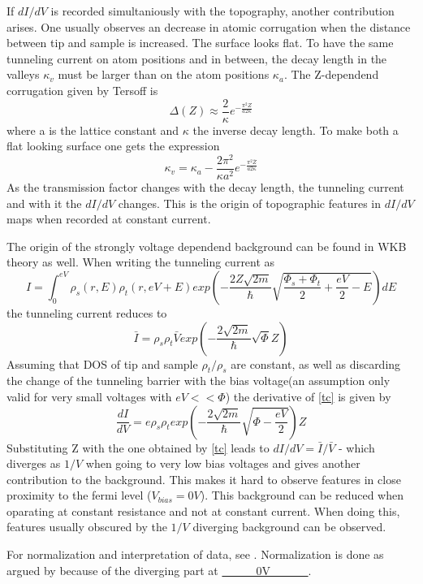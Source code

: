 If $dI/dV$ is recorded simultaniously with the topography, another contribution arises. One usually observes an decrease in atomic corrugation when the distance between tip and sample is increased. The surface looks flat. To have the same tunneling current on atom positions and in between, the decay length in the valleys $\kappa_v$ must be larger than on the atom positions $\kappa_a$. The Z-dependend corrugation given by Tersoff is $$\Delta(Z)\approx \frac{2}{\kappa}e^{-\frac{\pi^2Z}{a2\kappa}}$$ where a is the lattice constant and $\kappa$ the inverse decay length. To make both a flat looking surface one gets the expression
$$\kappa_v=\kappa_a-\frac{2\pi^2}{\kappa a^2}e^{-\frac{\pi^2\bar Z}{a2\kappa}}$$ 
As the transmission factor changes with the decay length, the tunneling current and with it the $dI/dV$ changes. This is the origin of topographic features in $dI/dV$ maps when recorded at constant current.

The origin of the strongly voltage dependend background can be found in WKB theory as well.
When writing the tunneling current as 
$$ I=\int_0^{eV}\rho_s(r,E)\rho_t(r,eV+E)exp\left(-\frac{2Z\sqrt{2m}}{\hbar}\sqrt{\frac{\Phi_s+\Phi_t}{2}+\frac{eV}{2}-E}\right)dE $$
the tunneling current reduces to 
\begin{equation}
\bar I=\rho_s\rho_t \bar V exp\left(-\frac{2\sqrt{2m}}{\hbar}\sqrt{\Phi}Z\right)
\label{tc}
\end{equation}
Assuming that DOS of tip and sample $\rho_t/\rho_s$ are constant, as well as discarding the change of the tunneling barrier with the bias voltage(an assumption only valid for very small voltages with $eV<<\Phi$) the derivative of \eqref{tc} is given by
$$\frac{dI}{dV}=e\rho_s\rho_texp\left(-\frac{2\sqrt{2m}}{\hbar}\sqrt{\Phi-\frac{eV}{2}}\right)Z$$
Substituting Z with the one obtained by \eqref{tc} leads to $dI/dV= \bar I / \bar V$ - which diverges as  $1/V$ when going to very low bias voltages and gives another contribution to the background. This makes it hard to observe features in close proximity to the fermi level ($V_{bias}=0V$). This background can be reduced when oparating at constant resistance and not at constant current. When doing this, features usually obscured by the $1/V$ diverging background can be observed.

For normalization and interpretation of data, see \cite{bonnell_scanning_1993}.
Normalization is done as argued by\cite{feenstra_tunneling_1987} because of the diverging part at \underline{\ \ \ \ \ \ 0V \ \ \ \ \ \ }.

